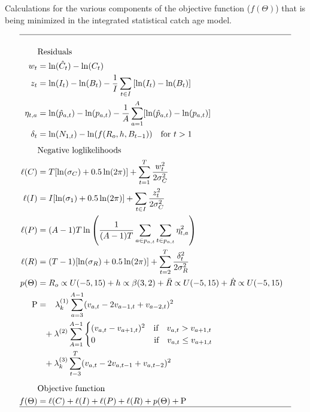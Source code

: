 \begin{table}[!tbh]
	\tableEq
	\caption{Calculations for the various components of the objective function ($f(\Theta)$) that is being minimized in the integrated statistical catch age model.}\label{tab:likelihoods}
	\begin{align}
		\hline \nonumber\\
		&\mbox{Residuals}\nonumber\\
		w_t&= \ln(\hat{C}_t) - \ln(C_t)\label{eq:T1.1}\\
		z_t&= \ln(I_t) - \ln(B_t) - \frac{1}{I}\sum_{t\in I}\left[\ln(I_t) - \ln(B_t)\right]\label{eq:T1.2}\\
		\eta_{t,a}&= \ln(\hat{p}_{a,t}) - \ln(p_{a,t})
				 - \frac{1}{A}\sum_{a=1}^A [\ln(\hat{p}_{a,t}) - \ln(p_{a,t})]
				 \label{eq:T1.3}\\
		\delta_t &= \ln(N_{1,t}) - \ln(f(R_o,h,B_{t-1})) \quad
		\mbox{for $t > 1$}\label{eq:T1.4}\\[1ex]
		&\mbox{Negative loglikelihoods}\nonumber\\
		\ell(C)& = T [\ln(\sigma_C) + 0.5\ln(2 \pi) ] +\sum_{t=1}^T
		\frac{w_t^2}{2\sigma_C^2} \label{eq:L1.1}\\
		\ell(I)& = I[\ln(\sigma_1) + 0.5\ln(2 \pi) ] + \sum_{t \in I}
		\frac{z_t^2}{2\sigma_C^2} \label{eq:L1.2} \\
		\ell(P)& = (A-1)T \ln\left(\frac{1}{(A-1)T}\sum_{a\in p_{a,t}} 
		\sum_{t\in p_{a,t}} \eta_{t,a}^2 \right)\label{eq:L1.3} \\
		\ell(R)& = (T-1)[\ln(\sigma_R) + 0.5\ln(2 \pi) ] + \sum_{t =2}^T
		\frac{\delta_t^2}{2\sigma_R^2} \label{eq:L1.4} \\
		{p}(\Theta) & = R_o \propto U(-5,15) + h\propto \beta(3,2)
			+ \bar{R} \propto U(-5,15) +\dot{R} \propto U(-5,15)
			\label{eq:L1.5}\\
		\mathrm{P} & = \phantom{+} \lambda^{(1)}_k \sum_{a=3}^{A-1}(v_{a,t}-2v_{a-1,t} + v_{a-2,t})^2
		\nonumber\\
		\phantom{P} & \phantom{=}+ \lambda^{(2)}\sum_{A=1}^{A-1}
		\begin{cases}
			(v_{a,t}-v_{a+1,t})^2\quad \mbox{if}\quad v_{a,t} > v_{a+1,t}\\
			0\phantom{ (v_{a,t}-v_{a+1,t})} \quad \mbox{if} \quad v_{a,t} \leq v_{a+1,t}
		\end{cases}\nonumber\\
		\phantom{P} & \phantom{=}+ \lambda_k^{(3)} \sum_{t-3}^T
		(v_{a,t}-2v_{a,t-1} + v_{a,t-2})^2
		 \label{eq:L1.6}\\[1ex]
		&\mbox{Objective function}\nonumber\\
		f(\Theta)& = \ell(C) + \ell(I) + \ell(P) + \ell(R) +{p}(\Theta) + \mathrm{P}\\
		\hline \nonumber
	\end{align}
	\normalEq
\end{table}

